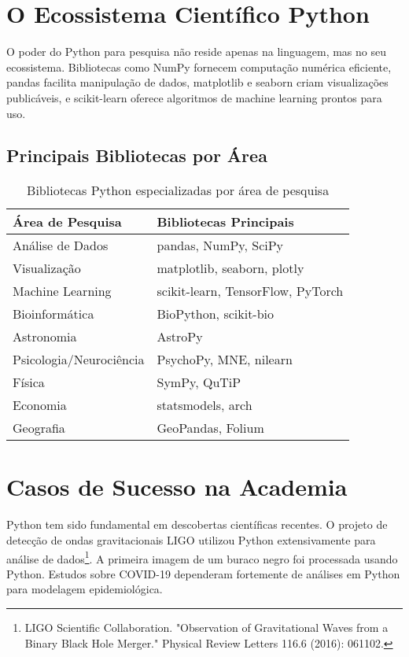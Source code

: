 \section{O Ecossistema Científico Python}

O poder do Python para pesquisa não reside apenas na linguagem, mas no seu ecossistema. Bibliotecas como NumPy fornecem computação numérica eficiente, pandas facilita manipulação de dados, matplotlib e seaborn criam visualizações publicáveis, e scikit-learn oferece algoritmos de machine learning prontos para uso.

\subsection{Principais Bibliotecas por Área}

\begin{table}[H]
\centering
\begin{tabular}{@{}ll@{}}
\toprule
\textbf{Área de Pesquisa} & \textbf{Bibliotecas Principais} \\
\midrule
Análise de Dados & pandas, NumPy, SciPy \\
Visualização & matplotlib, seaborn, plotly \\
Machine Learning & scikit-learn, TensorFlow, PyTorch \\
Bioinformática & BioPython, scikit-bio \\
Astronomia & AstroPy \\
Psicologia/Neurociência & PsychoPy, MNE, nilearn \\
Física & SymPy, QuTiP \\
Economia & statsmodels, arch \\
Geografia & GeoPandas, Folium \\
\bottomrule
\end{tabular}
\caption{Bibliotecas Python especializadas por área de pesquisa}
\end{table}

\section{Casos de Sucesso na Academia}

Python tem sido fundamental em descobertas científicas recentes. O projeto de detecção de ondas gravitacionais LIGO utilizou Python extensivamente para análise de dados\footnote{LIGO Scientific Collaboration. "Observation of Gravitational Waves from a Binary Black Hole Merger." Physical Review Letters 116.6 (2016): 061102.}. A primeira imagem de um buraco negro foi processada usando Python. Estudos sobre COVID-19 dependeram fortemente de análises em Python para modelagem epidemiológica.

